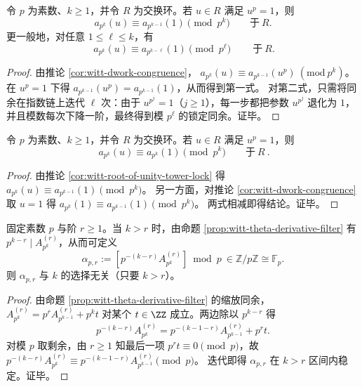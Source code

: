 \begin{corollary}[\texorpdfstring{$u^p=1$}{u^p=1} 的塔式锁定：扭曲迹被推回无扭曲层]\label{cor:witt-root-of-unity-tower-lock}
令 \(p\) 为素数、\(k\ge 1\)，并令 \(R\) 为交换环。若 \(u\in R\) 满足 \(u^p=1\)，则
\[
a_{p^k}(u)\equiv a_{p^{k-1}}(1)\pmod{p^k}\qquad\text{于}\ R.
\]
更一般地，对任意 \(1\le \ell\le k\)，有
\[
\boxed{\ a_{p^k}(u)\equiv a_{p^{k-\ell}}(1)\pmod{p^\ell}\ }\qquad\text{于}\ R.
\]
\end{corollary}
\begin{proof}
由推论 \ref{cor:witt-dwork-congruence}，
\(
a_{p^k}(u)\equiv a_{p^{k-1}}(u^p)\ (\mathrm{mod}\ p^k)
\)。
在 \(u^p=1\) 下得 \(a_{p^{k-1}}(u^p)=a_{p^{k-1}}(1)\)，从而得到第一式。
对第二式，只需将同余在指数链上迭代 \(\ell\) 次：由于 \(u^{p^j}=1\)（\(j\ge 1\)），每一步都把参数 \(u^{p^j}\) 退化为 \(1\)，并且模数每次下降一阶，最终得到模 \(p^\ell\) 的锁定同余。证毕。
\end{proof}

\begin{corollary}\label{cor:witt-cyclotomic-invisibility}
令 \(p\) 为素数、\(k\ge 1\)，并令 \(R\) 为交换环。若 \(u\in R\) 满足 \(u^p=1\)，则
\[
\boxed{\ a_{p^k}(u)\equiv a_{p^k}(1)\pmod{p^k}\qquad\text{于}\ R\ }.
\]
\end{corollary}
\begin{proof}
由推论 \ref{cor:witt-root-of-unity-tower-lock} 得 \(a_{p^k}(u)\equiv a_{p^{k-1}}(1)\pmod{p^k}\)。
另一方面，对推论 \ref{cor:witt-dwork-congruence} 取 \(u=1\) 得 \(a_{p^k}(1)\equiv a_{p^{k-1}}(1)\pmod{p^k}\)。
两式相减即得结论。证毕。
\end{proof}

\begin{corollary}\label{cor:witt-theta-stable-residue}
固定素数 \(p\) 与阶 \(r\ge 1\)。当 \(k>r\) 时，由命题 \ref{prop:witt-theta-derivative-filter} 有 \(p^{k-r}\mid A_{p^k}^{(r)}\)，从而可定义
\[
\alpha_{p,r}:=\left[p^{-(k-r)}A_{p^k}^{(r)}\right]\bmod p\ \in \mathbb{Z}/p\mathbb{Z}\cong\mathbb{F}_p.
\]
则 \(\alpha_{p,r}\) 与 \(k\) 的选择无关（只要 \(k>r\)）。
\end{corollary}
\begin{proof}
由命题 \ref{prop:witt-theta-derivative-filter} 的缩放同余，
\(
A_{p^k}^{(r)}=p^rA_{p^{k-1}}^{(r)}+p^k t
\)
对某个 \(t\in\ZZ\) 成立。两边除以 \(p^{k-r}\) 得
\[
p^{-(k-r)}A_{p^k}^{(r)}=p^{-(k-1-r)}A_{p^{k-1}}^{(r)}+p^{r}t.
\]
对模 \(p\) 取剩余，由 \(r\ge 1\) 知最后一项 \(p^r t\equiv 0\pmod p\)，故
\(
p^{-(k-r)}A_{p^k}^{(r)}\equiv p^{-(k-1-r)}A_{p^{k-1}}^{(r)}\pmod p
\)。
迭代即得 \(\alpha_{p,r}\) 在 \(k>r\) 区间内稳定。证毕。
\end{proof}

